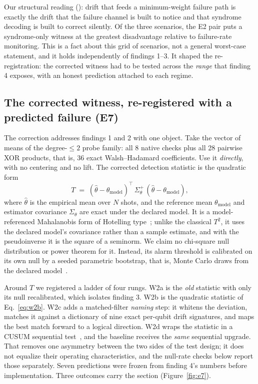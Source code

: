 Our structural reading (\gInterp): drift that feeds a minimum-weight failure path is exactly the drift that the failure channel is built to notice and that syndrome decoding is built to correct silently. Of the three scenarios, the E2 pair puts a syndrome-only witness at the greatest disadvantage relative to failure-rate monitoring. This is a fact about this grid of scenarios, not a general worst-case statement, and it holds independently of findings 1--3. It shaped the re-registration: the corrected witness had to be tested across the \emph{range} that finding 4 exposes, with an honest prediction attached to each regime.

\subsection{The corrected witness, re-registered with a predicted failure (E7)}
\label{sec:e7}

The correction addresses findings 1 and 2 with one object. Take the vector of means of the degree-$\le 2$ probe family: all 8 native checks plus all 28 pairwise XOR products, that is, 36 exact Walsh--Hadamard coefficients. Use it \emph{directly}, with no centering and no lift. The corrected detection statistic is the quadratic form
\begin{equation}
T \;=\; (\hat\theta - \theta_{\mathrm{model}})^{\top}\, \Sigma_{\theta}^{+}\, (\hat\theta - \theta_{\mathrm{model}}),
\label{eq:w2b}
\end{equation}
where $\hat\theta$ is the empirical mean over $N$ shots, and the reference mean $\theta_{\mathrm{model}}$ and estimator covariance $\Sigma_\theta$ are exact under the declared model. It is a model-referenced Mahalanobis form of Hotelling type~\cite{hotelling1931ratio}; unlike the classical $T^{2}$, it uses the declared model's covariance rather than a sample estimate, and with the pseudoinverse it is the square of a seminorm. We claim no chi-square null distribution or power theorem for it. Instead, its alarm threshold is calibrated on its own null by a seeded parametric bootstrap, that is, Monte Carlo draws from the declared model~\cite{efron1979bootstrap}.

Around $T$ we registered a ladder of four rungs. W2a is the \emph{old} statistic with only its null recalibrated, which isolates finding 3. W2b is the quadratic statistic of Eq.~\eqref{eq:w2b}. W2c adds a matched-filter \emph{naming} step: it whitens the deviation, matches it against a dictionary of nine exact per-qubit drift signatures, and maps the best match forward to a logical direction. W2d wraps the statistic in a CUSUM sequential test~\cite{page1954continuous}, and the baseline receives the \emph{same} sequential upgrade. That removes one asymmetry between the two sides of the test design; it does not equalize their operating characteristics, and the null-rate checks below report those separately. Seven predictions were frozen from finding 4's numbers before implementation. Three outcomes carry the section (Figure~\ref{fig:e7}).

